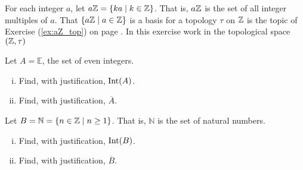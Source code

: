 \item For each integer $a$, let $a\mathbb{Z} = \{ka \mid k \in \mathbb{Z}\}$. That is, $a\mathbb{Z}$ is the set of all integer multiples of $a$.  That $\{a\mathbb{Z} \mid a \in \mathbb{Z}\}$ is a basis for a topology $\tau$ on $\mathbb{Z}$ is the topic of Exercise (\ref{ex:aZ_top}) on page \pageref{ex:aZ_top}. In this exercise work in the topological space $(\mathbb{Z}, \tau)$
\ba
\item Let $A = \mathbb{E}$, the set of even integers.
	\begin{enumerate}[i.]
	\item Find, with justification, $\text{Int}(A)$.
	
	\item Find, with justification, $\overline{A}$.
	
	\end{enumerate}


	\item Let $B = \mathbb{N} = \{n \in \mathbb{Z} \mid n \geq 1\}$. That is, $\mathbb{N}$ is the set of natural numbers.  
	\begin{enumerate}[i.]
	\item Find, with justification, $\text{Int}(B)$.
	
	\item Find, with justification, $\overline{B}$. 
	
	\end{enumerate}

\ea

